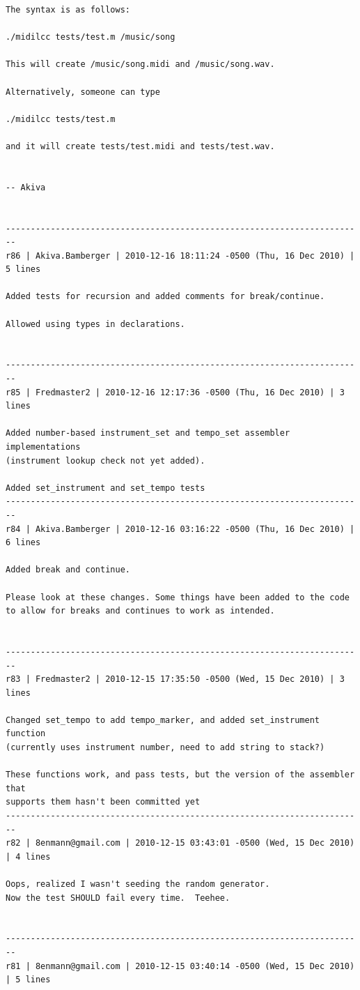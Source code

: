 \documentclass[12pt,A4]{book}
\begin{document}
\begin{verbatim}
The syntax is as follows:

./midilcc tests/test.m /music/song

This will create /music/song.midi and /music/song.wav.

Alternatively, someone can type

./midilcc tests/test.m

and it will create tests/test.midi and tests/test.wav.


-- Akiva


------------------------------------------------------------------------
r86 | Akiva.Bamberger | 2010-12-16 18:11:24 -0500 (Thu, 16 Dec 2010) | 5 lines

Added tests for recursion and added comments for break/continue.

Allowed using types in declarations.


------------------------------------------------------------------------
r85 | Fredmaster2 | 2010-12-16 12:17:36 -0500 (Thu, 16 Dec 2010) | 3 lines

Added number-based instrument_set and tempo_set assembler implementations 
(instrument lookup check not yet added).

Added set_instrument and set_tempo tests
------------------------------------------------------------------------
r84 | Akiva.Bamberger | 2010-12-16 03:16:22 -0500 (Thu, 16 Dec 2010) | 6 lines

Added break and continue.

Please look at these changes. Some things have been added to the code
to allow for breaks and continues to work as intended.


------------------------------------------------------------------------
r83 | Fredmaster2 | 2010-12-15 17:35:50 -0500 (Wed, 15 Dec 2010) | 3 lines

Changed set_tempo to add tempo_marker, and added set_instrument function 
(currently uses instrument number, need to add string to stack?)

These functions work, and pass tests, but the version of the assembler that 
supports them hasn't been committed yet
------------------------------------------------------------------------
r82 | 8enmann@gmail.com | 2010-12-15 03:43:01 -0500 (Wed, 15 Dec 2010) | 4 lines

Oops, realized I wasn't seeding the random generator.
Now the test SHOULD fail every time.  Teehee.


------------------------------------------------------------------------
r81 | 8enmann@gmail.com | 2010-12-15 03:40:14 -0500 (Wed, 15 Dec 2010) | 5 lines


\end{verbatim}
\end{document}
